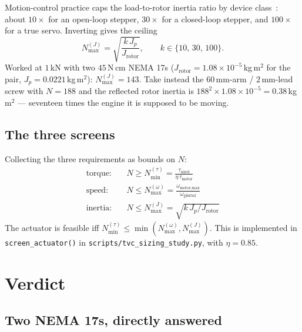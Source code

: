 \documentclass[11pt]{article}
\newcommand{\cmd}[1]{\nolinkurl{#1}}
\begin{document}
Motion-control practice caps the load-to-rotor inertia ratio by device
class~\cite{orientalmotor}: about $10\times$ for an open-loop stepper,
$30\times$ for a closed-loop stepper, and $100\times$ for a true servo.
Inverting gives the ceiling
\begin{equation}
N_{\max}^{(J)} = \sqrt{\frac{k\,J_p}{J_{\text{rotor}}}},
\qquad k \in \{10,\,30,\,100\}.
\end{equation}
Worked at $1$\,kN with two $45$\,N\,cm NEMA 17s
($J_{\text{rotor}}=1.08\times10^{-5}$\,kg\,m$^2$ for the pair,
$J_p = 0.0221$\,kg\,m$^2$): $N_{\max}^{(J)} = 143$. Take instead the
$60$\,mm-arm / $2$\,mm-lead screw with $N = 188$ and the reflected rotor
inertia is $188^2 \times 1.08\times10^{-5} = 0.38$\,kg\,m$^2$ --- seventeen
times the engine it is supposed to be moving.

\subsection{The three screens}
\label{sec:screens}

Collecting the three requirements as bounds on $N$:
\begin{align}
\text{torque:}  &\quad N \geq N_{\min}^{(\tau)} = \frac{\tau_{\text{sized}}}{\eta\,\tau_{\text{motor}}}\\
\text{speed:}   &\quad N \leq N_{\max}^{(\omega)} = \frac{\omega_{\text{motor,max}}}{\omega_{\text{gimbal}}}\\
\text{inertia:} &\quad N \leq N_{\max}^{(J)} = \sqrt{k\,J_p / J_{\text{rotor}}}
\end{align}
The actuator is feasible iff
$N_{\min}^{(\tau)} \leq \min\!\left(N_{\max}^{(\omega)}, N_{\max}^{(J)}\right)$.
This is implemented in \cmd{screen\_actuator()} in
\cmd{scripts/tvc\_sizing\_study.py}, with $\eta = 0.85$.

\section{Verdict}

\subsection{Two NEMA 17s, directly answered}
\end{document}
